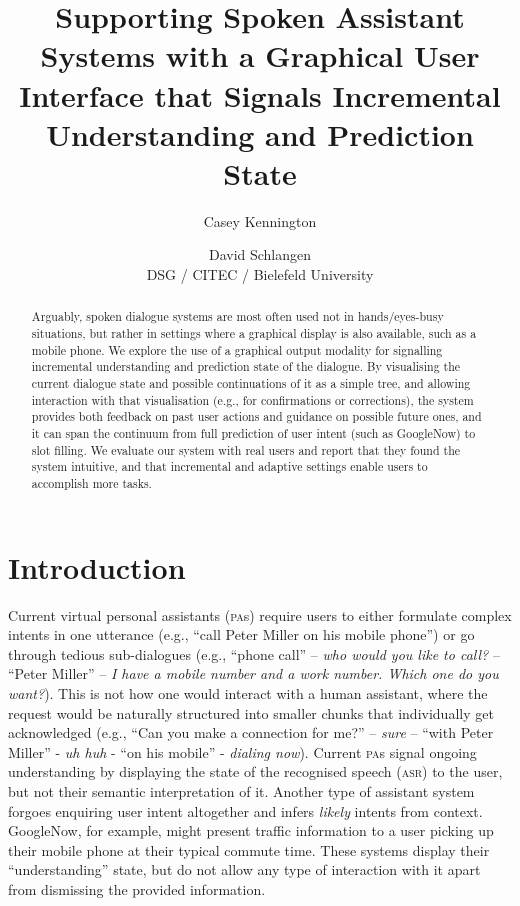 \documentclass[11pt]{article}
\title{Supporting Spoken Assistant Systems with a Graphical User\\ Interface that Signals Incremental Understanding and Prediction State}
\author{Casey Kennington \and David Schlangen\\DSG / CITEC / Bielefeld University}
\newcommand{\asr}[0]{\textsc{asr}}
\newcommand{\pa}[0]{\textsc{pa}}
\begin{document}

\maketitle

\begin{abstract}
Arguably, spoken dialogue systems are most often used not in hands/eyes-busy situations, but rather in settings where a graphical display is also available, such as a mobile phone. We explore the use of a graphical output modality for signalling incremental understanding and prediction state of the dialogue. By visualising the current dialogue state and possible continuations of it as a simple tree, and allowing interaction with that visualisation (e.g., for confirmations or corrections), the system provides both feedback on past user actions and guidance on possible future ones, and it can span the continuum from full prediction of user intent (such as GoogleNow) to slot filling. We evaluate our system with real users and report that they found the system intuitive, and that incremental and adaptive settings enable users to accomplish more tasks.
\end{abstract}

\section{Introduction}
\label{section:intro}

Current virtual personal assistants (\pa s) require users to either formulate complex intents in one utterance (e.g., ``call Peter Miller on his mobile phone'') or go through tedious sub-dialogues (e.g., ``phone call'' -- \emph{who would you like to call?} -- ``Peter Miller'' -- \emph{I have a mobile number and a work number. Which one do you want?}). This is not how one would interact with a human assistant, where the request would be naturally structured into smaller chunks that individually get acknowledged (e.g., ``Can you make a connection for me?'' -- \emph{sure} -- ``with Peter Miller'' - \emph{uh huh} - ``on his mobile'' - \emph{dialing now}). Current \pa s signal ongoing understanding by displaying the state of the recognised speech (\asr) to the user, but not their semantic interpretation of it. Another type of assistant system forgoes enquiring user intent altogether and infers \emph{likely} intents from context. GoogleNow, for example, might present traffic information to a user picking up their mobile phone at their typical commute time. These systems display their ``understanding'' state, but do not allow any type of interaction with it apart from dismissing the provided information.
\end{document}
